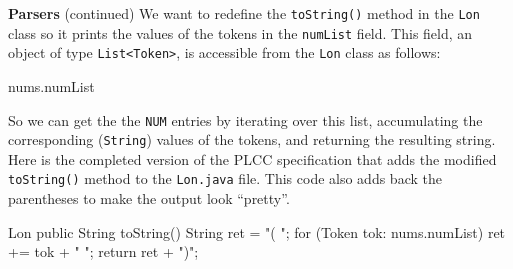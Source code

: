 \begin{minipage}[t]{\sw}
\slidenumber
\LARGE
{\bf Parsers} (continued)\exx
\Large
\emm\LightBox{\MYlonGrammarKleene}\exx
We want to redefine the \verb'toString()' method
in the \verb'Lon' class
so it prints the values of the tokens in the \verb'numList' field.
This field, an object of type \verb'List<Token>',
is accessible from the \verb'Lon' class
as follows:
\begin{qv}
nums.numList
\end{qv}
So we can get the the \verb'NUM' entries by iterating
over this list,
accumulating the corresponding (\verb'String') values of the tokens,
and returning the resulting string.
Here is the completed version of the PLCC specification
that adds the modified \verb'toString()' method to the \verb'Lon.java' file.
This code also adds back the parentheses to make the output look ``pretty''.
\begin{qv}
Lon
    public String toString() {
        String ret = "( ";
        for (Token tok: nums.numList) {
            ret += tok + " ";
        }
        return ret + ")";
    }
\end{qv}
\end{minipage}
\clearpage
